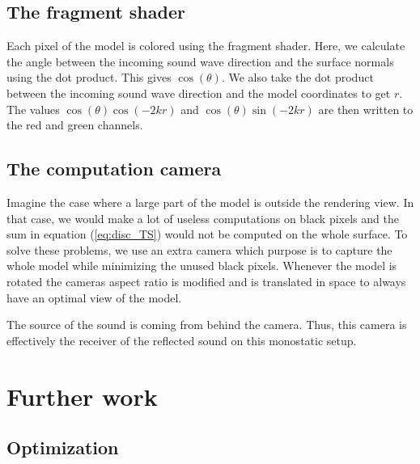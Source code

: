 \documentclass[a4paper, 11pt]{article}
\begin{document}
    \subsection{The fragment shader}
        
        Each pixel of the model is colored using the fragment shader. Here, we calculate the angle between the incoming sound wave direction and the surface normals using the dot product. This gives $\cos(\theta)$. We also take the dot product between the incoming sound wave direction and the model coordinates to get $r$. The values $\cos(\theta)\cos(-2kr)$ and $\cos(\theta)\sin(-2kr)$ are then written to the red and green channels. 
    
    \subsection{The computation camera}
        
        Imagine the case where a large part of the model is outside the rendering view. In that case, we would make a lot of useless computations on black pixels and the sum in equation (\ref{eq:disc_TS}) would not be computed on the whole surface. To solve these problems, we use an extra camera which purpose is to capture the whole model while minimizing the unused black pixels. Whenever the model is rotated the cameras aspect ratio is modified and is translated in space to always have an optimal view of the model. 

        The source of the sound is coming from behind the camera. Thus, this camera is effectively the receiver of the reflected sound on this monostatic setup. 
     
\section{Further work}

    \subsection{Optimization}
        
\end{document}
